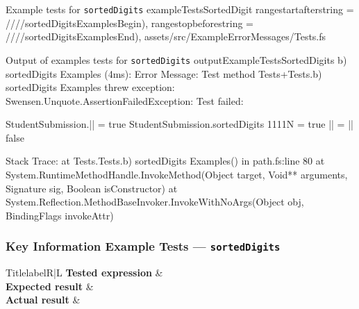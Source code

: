 \fsharpinput%
{Example tests for \texttt{sortedDigits}}%
{exampleTestsSortedDigit}%
{
	rangestartafterstring = ////sortedDigitsExamplesBegin),
	rangestopbeforestring = ////sortedDigitsExamplesEnd),
}%
{assets/src/ExampleErrorMessages/Tests.fs}




\begin{fsharpoutput}%
{Output of examples tests for \texttt{sortedDigits}}%
{outputExampleTestsSortedDigits}
b) sortedDigits Examples (4ms): Error Message: Test method Tests+Tests.b) sortedDigits Examples threw exception:
   Swensen.Unquote.AssertionFailedException: Test failed:

   StudentSubmission.|| = true
   StudentSubmission.sortedDigits 1111N = true
   || = ||
   false

   Stack Trace:
		at Tests.Tests.b) sortedDigits Examples() in path\to\Tests.fs:line 80
		at System.RuntimeMethodHandle.InvokeMethod(Object target, Void** arguments, Signature sig, Boolean isConstructor)
	  	at System.Reflection.MethodBaseInvoker.InvokeWithNoArgs(Object obj, BindingFlags invokeAttr)
\end{fsharpoutput}


\subsubsection{Key Information Example Tests --- \texttt{sortedDigits}} %


\begin{tcbtabular}{Title}{label}{R|L}{\normalsize}
		\textbf{Tested expression} & \\ \hline
		\textbf{Expected result} & \\ \hline
		\textbf{Actual result} & \\ \hline
\end{tcbtabular}

